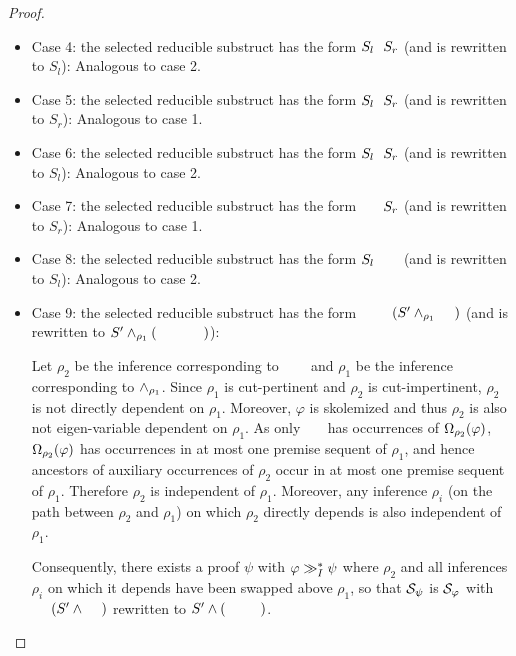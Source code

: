 \begin{proof}
\begin{itemize}
	\item Case 4: the selected reducible substruct has the form $S_l \hF{\structtimes} S_r$ (and is rewritten to $S_l$): Analogous to case 2.

	\item Case 5: the selected reducible substruct has the form $S_l \hF{\structplus} S_r$ (and is rewritten to $S_r$): Analogous to case 1.

	\item Case 6: the selected reducible substruct has the form $S_l \hF{\structplus} S_r$ (and is rewritten to $S_l$): Analogous to case 2.

	\item Case 7: the selected reducible substruct has the form $\hF{S_l} \hF{\structplus} S_r$ (and is rewritten to $S_r$): Analogous to case 1.

	\item Case 8: the selected reducible substruct has the form $S_l \hF{\structplus} \hF{S_r}$ (and is rewritten to $S_l$): Analogous to case 2.

	\item Case 9: the selected reducible substruct has the form $\hF{S} \hF{\structtimes_{\rho_2}} (S' \structplus_{\rho_1} \hF{S''})$ (and is rewritten to $S' \structplus_{\rho_1} (\hF{S} \hF{\structtimes_{\rho_2}} \hF{S''})$):

Let $\rho_2$ be the inference corresponding to $\hF{\structtimes_{\rho_2}}$ and $\rho_1$ be the inference corresponding to $\wedge_{\rho_1}$. Since $\rho_1$ is cut-pertinent and $\rho_2$ is cut-impertinent, $\rho_2$ is not directly dependent on $\rho_1$. Moreover, $\varphi$ is skolemized and thus $\rho_2$ is also not eigen-variable dependent on $\rho_1$. As only $\hF{S''}$ has occurrences of $\Omega_{\rho_2}(\varphi)$, $\Omega_{\rho_2}(\varphi)$ has occurrences in at most one premise sequent of $\rho_1$, and hence ancestors of auxiliary occurrences of $\rho_2$ occur in at most one premise sequent of $\rho_1$. Therefore $\rho_2$ is independent of $\rho_1$. Moreover, any inference $\rho_i$ (on the path between $\rho_2$ and $\rho_1$) on which $\rho_2$ directly depends is also independent of $\rho_1$.

Consequently, there exists a proof $\psi$ with $\varphi \gg_I^* \psi$ where $\rho_2$ and all inferences $\rho_i$ on which it depends have been swapped above $\rho_1$, so that $\mathcal{S}_{\psi}$ is $\mathcal{S}_{\varphi}$ with $\hF{S} \hF{\structtimes} (S' \structplus \hF{S''})$ rewritten to $S' \structplus (\hF{S} \hF{\structtimes} \hF{S''})$.



\end{itemize}
\end{proof}
